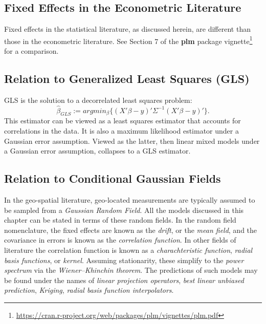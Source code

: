 \documentclass[]{book}
\renewcommand{\href}[2]{#2\footnote{\url{#1}}}
\theoremstyle{definition}
\theoremstyle{definition}
\theoremstyle{definition}
\theoremstyle{remark}
\begin{document}
\hypertarget{fixed-effects-in-the-econometric-literature}{%
\subsection{Fixed Effects in the Econometric Literature}\label{fixed-effects-in-the-econometric-literature}}

Fixed effects in the statistical literature, as discussed herein, are different than those in the econometric literature.
See Section 7 of the \textbf{plm} \href{https://cran.r-project.org/web/packages/plm/vignettes/plm.pdf}{package vignette} for a comparison.

\hypertarget{relation-to-generalized-least-squares-gls}{%
\subsection{Relation to Generalized Least Squares (GLS)}\label{relation-to-generalized-least-squares-gls}}

GLS is the solution to a decorrelated least squares problem:
\[\hat{\beta}_{GLS}:=argmin_\beta\{(X'\beta-y)'\Sigma^{-1}(X'\beta-y)'\}.\]
This estimator can be viewed as a least squares estimator that accounts for correlations in the data.
It is also a maximum likelihood estimator under a Gaussian error assumption.
Viewed as the latter, then linear mixed models under a Gaussian error assumption, collapses to a GLS estimator.

\hypertarget{relation-to-conditional-gaussian-fields}{%
\subsection{Relation to Conditional Gaussian Fields}\label{relation-to-conditional-gaussian-fields}}

In the geo-spatial literature, geo-located measurements are typically assumed to be sampled from a \emph{Gaussian Random Field}.
All the models discussed in this chapter can be stated in terms of these random fields.
In the random field nomenclature, the fixed effects are known as the \emph{drift}, or the \emph{mean field}, and the covariance in errors is known as the \emph{correlation function}.
In other fields of literature the correlation function is known as a \emph{charachteristic function}, \emph{radial basis functions}, or \emph{kernel}.
Assuming stationarity, these simplify to the \emph{power spectrum} via the \emph{Wiener--Khinchin theorem}.
The predictions of such models may be found under the names of \emph{linear projection operators}, \emph{best linear unbiased prediction}, \emph{Kriging}, \emph{radial basis function interpolators}.
\end{document}
